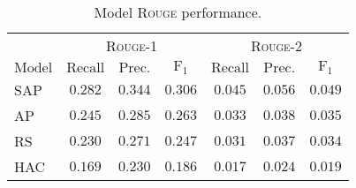\begin{table}[t]
\centering
\begin{tabular}{l c c c c c c}
\toprule
& \multicolumn{3}{c}{\textsc{Rouge-1}} & \multicolumn{3}{c}{\textsc{Rouge-2}}\\
\cmidrule(lr){2-4}
\cmidrule(lr){5-7}
$\mathrm{Model}$ & $\mathrm{Recall}$ & $\mathrm{Prec.}$ & $\mathrm{F}_1$
& $\mathrm{Recall}$ & $\mathrm{Prec.}$ & $\mathrm{F}_1$\\
\midrule
\textsc{SAP} & $\mathbf{0.282}$ & $\mathbf{0.344}$ & $\mathbf{0.306}$
& $\mathbf{0.045}$ & $\mathbf{0.056}$ & $\mathbf{0.049}$\\
AP          & $0.245$ & $0.285$ & $0.263$ & $0.033$ & $0.038$ & $0.035$ \\
RS          & $0.230$ & $0.271$ & $0.247$  & $0.031$ & $0.037$ & $0.034$ \\
HAC         & $0.169$ & $0.230$ & $0.186$ & $0.017$ & $0.024$ & $0.019$ \\
\bottomrule %
\end{tabular}
%
%
\caption{Model \textsc{Rouge} performance.} %
\label{tab:rouge}
\end{table}




